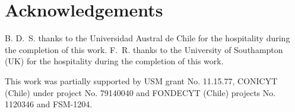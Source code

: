 \documentclass{ws-mpla}
\renewcommand{\(}{\left(}
\renewcommand{\)}{\right)}
\renewcommand{\[}{\left[}
\renewcommand{\]}{\right]}
\begin{document}
\section*{Acknowledgements}

B. D.~S. thanks to the Universidad Austral de Chile for the hospitality during the completion of this work. F.~R. thanks to the University of Southampton (UK) for the hospitality during the completion of this work.

This work was partially supported by USM grant No. 11.15.77, CONICYT (Chile) under project No. 79140040 and FONDECYT (Chile) projects No. 1120346 and FSM-1204.




\end{document}
